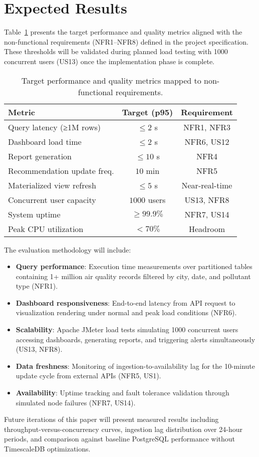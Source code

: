 \section{Expected Results}\label{sec:results}
Table~\ref{tab:targets} presents the target performance and quality metrics aligned with the non-functional requirements (NFR1–NFR8) defined in the project specification.  
These thresholds will be validated during planned load testing with 1000 concurrent users (US13) once the implementation phase is complete.

\begin{table}[tb]
\centering
\caption{Target performance and quality metrics mapped to non-functional requirements.}
\label{tab:targets}
\begin{tabular}{lcc}
\toprule
\textbf{Metric} & \textbf{Target (p95)} & \textbf{Requirement}\\
\midrule
Query latency (≥1M rows)      & $\le2$ s        & NFR1, NFR3\\
Dashboard load time           & $\le2$ s        & NFR6, US12\\
Report generation             & $\le10$ s       & NFR4\\
Recommendation update freq.   & $10$ min        & NFR5\\
Materialized view refresh     & $\le5$ s        & Near-real-time\\
Concurrent user capacity      & $1000$ users    & US13, NFR8\\
System uptime                 & $\ge99.9\%$     & NFR7, US14\\
Peak CPU utilization          & $<70\%$         & Headroom\\
\bottomrule
\end{tabular}
\end{table}

The evaluation methodology will include:
\begin{itemize}
    \item \textbf{Query performance}: Execution time measurements over partitioned tables containing 1+ million air quality records filtered by city, date, and pollutant type (NFR1).
    \item \textbf{Dashboard responsiveness}: End-to-end latency from API request to visualization rendering under normal and peak load conditions (NFR6).
    \item \textbf{Scalability}: Apache JMeter load tests simulating 1000 concurrent users accessing dashboards, generating reports, and triggering alerts simultaneously (US13, NFR8).
    \item \textbf{Data freshness}: Monitoring of ingestion-to-availability lag for the 10-minute update cycle from external APIs (NFR5, US1).
    \item \textbf{Availability}: Uptime tracking and fault tolerance validation through simulated node failures (NFR7, US14).
\end{itemize}

Future iterations of this paper will present measured results including throughput-versus-concurrency curves, ingestion lag distribution over 24-hour periods, and comparison against baseline PostgreSQL performance without TimescaleDB optimizations.
